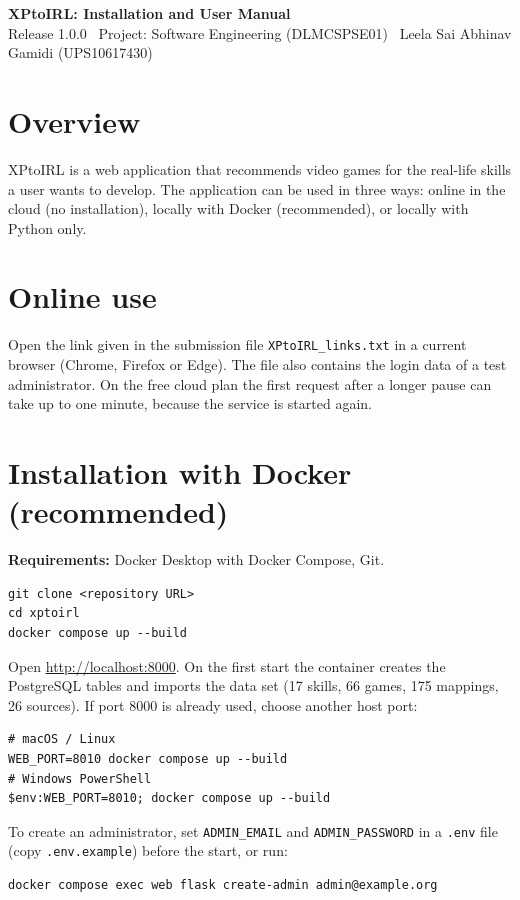 \documentclass[a4paper,11pt]{article}
\begin{document}
{\fontsize{16}{19}\selectfont\bfseries XPtoIRL: Installation and User Manual}\\[2pt]
Release 1.0.0 \textbar\ Project: Software Engineering (DLMCSPSE01) \textbar\ Leela Sai Abhinav Gamidi (UPS10617430)

\section{Overview}
XPtoIRL is a web application that recommends video games for the real-life skills a
user wants to develop. The application can be used in three ways: online in the cloud
(no installation), locally with Docker (recommended), or locally with Python only.

\section{Online use}
Open the link given in the submission file \texttt{XPtoIRL\_links.txt} in a current
browser (Chrome, Firefox or Edge). The file also contains the login data of a test
administrator. On the free cloud plan the first request after a longer pause can take
up to one minute, because the service is started again.

\section{Installation with Docker (recommended)}
\textbf{Requirements:} Docker Desktop with Docker Compose, Git.

\begin{Verbatim}
git clone <repository URL>
cd xptoirl
docker compose up --build
\end{Verbatim}

Open \url{http://localhost:8000}. On the first start the container creates the
PostgreSQL tables and imports the data set (17 skills, 66 games, 175 mappings,
26 sources). If port 8000 is already used, choose another host port:

\begin{Verbatim}
# macOS / Linux
WEB_PORT=8010 docker compose up --build
# Windows PowerShell
$env:WEB_PORT=8010; docker compose up --build
\end{Verbatim}

To create an administrator, set \texttt{ADMIN\_EMAIL} and \texttt{ADMIN\_PASSWORD} in a
\texttt{.env} file (copy \texttt{.env.example}) before the start, or run:

\begin{Verbatim}
docker compose exec web flask create-admin admin@example.org
\end{Verbatim}
\end{document}
